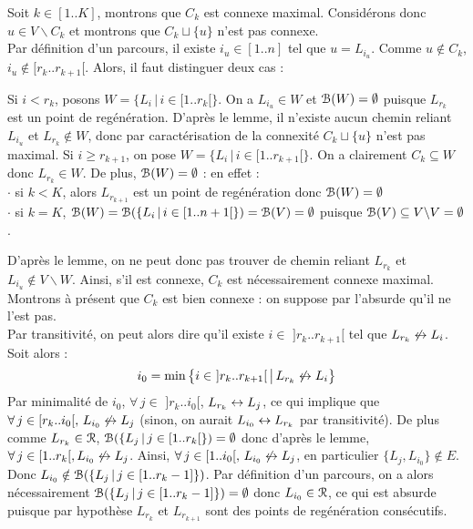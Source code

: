 		\begin{Preuve}[la propriété]
			Soit \(k\in[1..K]\), montrons que \(C_k\) est connexe maximal. \nt
			Considérons donc \(u\in V\backslash C_k\) et montrons que \(C_k \sqcup \{u\}\) n'est pas connexe. \\
			Par définition d'un parcours, il existe \(i_u\in [1..n]\) tel que \(u = L_{i_u}\). Comme \(u\notin C_k\), \(i_u \notin [r_k..r_{k+1}[\). Alors, il faut distinguer deux cas : 
				\begin{addmargin}{5mm}
					\bdot Si \(i < r_k\), posons \(W = \{L_i \,|\, i\in[1..r_k[\}\). On a \(L_{i_u} \in W\) et \(\EuScript{B}(W) = \emptyset\) puisque \(L_{r_k}\) est un point de regénération. D'après le lemme, il n'existe aucun chemin reliant \(L_{i_u}\) et \(L_{r_k} \notin W\), donc par caractérisation de la connexité \(C_k \sqcup \{u\}\) n'est pas maximal. \nt
					\bdot Si \(i \geq r_{k+1}\), on pose \(W = \{L_i \,|\, i\in [1..r_{k+1}[\}\). On a clairement \(C_k \subseteq W\) donc \(L_{r_k}\in W\). De plus, \(\EuScript{B}(W) = \emptyset\) : en effet : \\
						 \(\cdot\) si \(k < K\), alors \(L_{r_{k+1}}\) est un point de regénération donc \(\EuScript{B}(W) = \emptyset\)\\
						 \(\cdot\) si \(k = K\), \(\EuScript{B}(W) = \EuScript{B}(\{L_i \,|\, i\in [1..n+1[\}) = \EuScript{B}(V) = \emptyset\) puisque \(\EuScript{B}(V) \subseteq V\backslash V = \emptyset\).
				\end{addmargin} 
			D'après le lemme, on ne peut donc pas trouver de chemin reliant \(L_{r_k}\) et \(L_{i_u} \notin V\backslash W\). \nt
			Ainsi, s'il est connexe, \(C_k\) est nécessairement connexe maximal. \eqskip{2mm} \nll
			Montrons à présent que \(C_k\) est bien connexe : on suppose par l'absurde qu'il ne l'est pas. \\
			Par transitivité, on peut alors dire qu'il existe \(i\in \,\,]r_k..r_{k+1}[\) tel que \(L_{r_k} \not\leftrightarrow L_i\). Soit alors :
				\[
					i_0 = \min\left\{i\in \,\,]r_k..r_{k+1}[\,\middle|\, L_{r_k} \not\leftrightarrow L_i\right\}
				\]
			Par minimalité de \(i_0\), \(\forall\,j\in \,\,]r_k..i_0[\), \(L_{r_k} \leftrightarrow L_j\), ce qui implique que \(\forall\,j\in[r_k..i_0[, \,L_{i_0} \not\leftrightarrow L_{j}\) (sinon, on aurait \(L_{i_0} \leftrightarrow L_{r_k}\) par transitivité). De plus comme \(L_{r_k} \in \EuScript{R}\), \(\EuScript{B}(\{L_j\,|\, j\in[1..r_k[\}) = \emptyset\) donc d'après le lemme, \(\forall\,j\in [1..r_k[, L_{i_0} \not\leftrightarrow L_j\). \nt
			Ainsi, \(\forall\,j \in [1..i_0[,\, L_{i_0} \not\leftrightarrow L_j\), en particulier \(\{L_j,L_{i_0}\}\notin E\). Donc \(L_{i_0} \notin \EuScript{B}(\{L_j\,|\, j\in[1..r_k-1]\})\). \nt
			Par définition d'un parcours, on a alors nécessairement \(\EuScript{B}(\{L_j\,|\, j\in[1..r_k-1]\}) = \emptyset\) donc \(L_{i_0} \in \EuScript{R}\), ce qui est absurde puisque par hypothèse \(L_{r_k}\) et \(L_{r_{k+1}}\) sont des points de regénération consécutifs.
		\end{Preuve}
		
